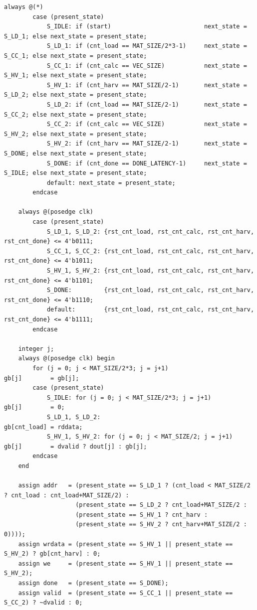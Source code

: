 \documentclass{article}
\begin{document}
\begin{lstlisting}[style={verilog-style}]
    always @(*)
        case (present_state)
            S_IDLE: if (start)                          next_state = S_LD_1; else next_state = present_state;
            S_LD_1: if (cnt_load == MAT_SIZE/2*3-1)     next_state = S_CC_1; else next_state = present_state;
            S_CC_1: if (cnt_calc == VEC_SIZE)           next_state = S_HV_1; else next_state = present_state;
            S_HV_1: if (cnt_harv == MAT_SIZE/2-1)       next_state = S_LD_2; else next_state = present_state;
            S_LD_2: if (cnt_load == MAT_SIZE/2-1)       next_state = S_CC_2; else next_state = present_state;
            S_CC_2: if (cnt_calc == VEC_SIZE)           next_state = S_HV_2; else next_state = present_state;
            S_HV_2: if (cnt_harv == MAT_SIZE/2-1)       next_state = S_DONE; else next_state = present_state;
            S_DONE: if (cnt_done == DONE_LATENCY-1)     next_state = S_IDLE; else next_state = present_state;
            default: next_state = present_state;
        endcase
    
    always @(posedge clk)
        case (present_state)
            S_LD_1, S_LD_2: {rst_cnt_load, rst_cnt_calc, rst_cnt_harv, rst_cnt_done} <= 4'b0111;
            S_CC_1, S_CC_2: {rst_cnt_load, rst_cnt_calc, rst_cnt_harv, rst_cnt_done} <= 4'b1011;
            S_HV_1, S_HV_2: {rst_cnt_load, rst_cnt_calc, rst_cnt_harv, rst_cnt_done} <= 4'b1101;
            S_DONE:         {rst_cnt_load, rst_cnt_calc, rst_cnt_harv, rst_cnt_done} <= 4'b1110;
            default:        {rst_cnt_load, rst_cnt_calc, rst_cnt_harv, rst_cnt_done} <= 4'b1111;
        endcase
        
    integer j;
    always @(posedge clk) begin
        for (j = 0; j < MAT_SIZE/2*3; j = j+1)                      gb[j]        = gb[j];
        case (present_state)
            S_IDLE: for (j = 0; j < MAT_SIZE/2*3; j = j+1)          gb[j]        = 0;
            S_LD_1, S_LD_2:                                         gb[cnt_load] = rddata;
            S_HV_1, S_HV_2: for (j = 0; j < MAT_SIZE/2; j = j+1)    gb[j]        = dvalid ? dout[j] : gb[j];
        endcase
    end
    
    assign addr   = (present_state == S_LD_1 ? (cnt_load < MAT_SIZE/2 ? cnt_load : cnt_load+MAT_SIZE/2) : 
                    (present_state == S_LD_2 ? cnt_load+MAT_SIZE/2 :
                    (present_state == S_HV_1 ? cnt_harv : 
                    (present_state == S_HV_2 ? cnt_harv+MAT_SIZE/2 : 0))));
    assign wrdata = (present_state == S_HV_1 || present_state == S_HV_2) ? gb[cnt_harv] : 0;
    assign we     = (present_state == S_HV_1 || present_state == S_HV_2);
    assign done   = (present_state == S_DONE);
    assign valid  = (present_state == S_CC_1 || present_state == S_CC_2) ? ~dvalid : 0;
    

\end{lstlisting}
\end{document}
